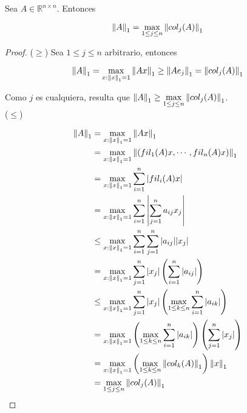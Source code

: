 \begin{propo}
Sea $A \in \mathbb{R}^{n \times n}$. Entonces

\[\left\lVert A\right\rVert_{1} = \max\limits_{1 \leq j \leq n} \left\lVert col_j(A)\right\rVert_1\]

\begin{proof}
($\geq$) Sea $1 \leq j \leq n$ arbitrario, entonces

\[\left\lVert A\right\rVert_1 = \max\limits_{x : \left\lVert x\right\rVert_1 = 1} \left\lVert Ax\right\rVert_1 \geq \left\lVert A e_j\right\rVert_1 = \left\lVert col_j(A)\right\rVert_1\]

Como $j$ es cualquiera, resulta que $\left\lVert A\right\rVert_1 \geq \max\limits_{1 \leq j \leq n} \left\lVert col_j(A)\right\rVert_1$.\\[0.25cm]

($\leq$)

\begin{align*}
\left\lVert A\right\rVert_1 &= \max\limits_{x : \left\lVert x\right\rVert_1 = 1} \left\lVert Ax\right\rVert_1\\
& = \max\limits_{x : \left\lVert x\right\rVert_1 = 1} \left\lVert(fil_1(A) x, \cdots, fil_n(A) x)\right\rVert_1\\
& = \max\limits_{x : \left\lVert x\right\rVert_1 = 1} \sum_{i = 1}^n |fil_i(A) x|\\
& = \max\limits_{x : \left\lVert x\right\rVert_1 = 1} \sum_{i = 1}^n \left|\sum_{j = 1}^n a_{ij} x_j\right|\\
& \leq \max\limits_{x : \left\lVert x\right\rVert_1 = 1} \sum_{i = 1}^n \sum_{j = 1}^n |a_{ij}| |x_j|\\
& = \max\limits_{x : \left\lVert x\right\rVert_1 = 1} \sum_{j = 1}^n |x_j| \left(\sum_{i = 1}^n |a_{ij}|\right)\\
& \leq \max\limits_{x : \left\lVert x\right\rVert_1 = 1} \sum_{j = 1}^n |x_j| \left(\max\limits_{1 \leq k \leq n} \sum_{i = 1}^n |a_{ik}|\right)\\
& = \max\limits_{x : \left\lVert x\right\rVert_1 = 1} \left(\max\limits_{1 \leq k \leq n} \sum_{i = 1}^n |a_{ik}|\right)\left(\sum_{j = 1}^n |x_j|\right)\\
& = \max\limits_{x : \left\lVert x\right\rVert_1 = 1} \left(\max\limits_{1 \leq k \leq n} \left\lVert col_k(A)\right\rVert_1\right) \left\lVert x\right\rVert_1\\
& = \max \limits_{1 \leq j \leq n}\left\lVert col_j(A)\right\rVert_1
\end{align*}

\end{proof}
\end{propo}

